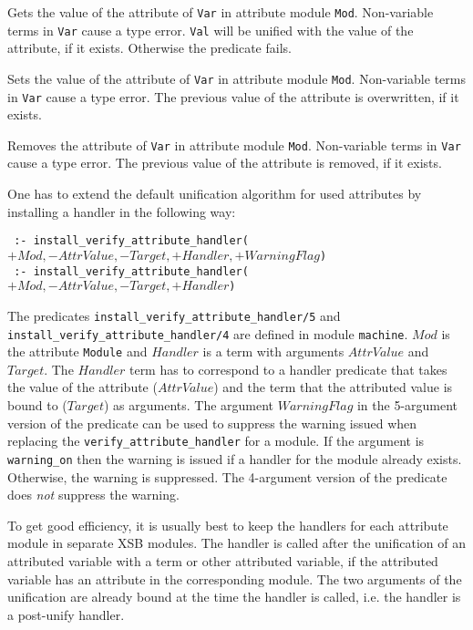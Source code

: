 \begin{description}
%
Gets the value of the attribute of \texttt{Var} in attribute module
\texttt{Mod}. Non-variable terms in \texttt{Var} cause a type
error. \texttt{Val} will be unified with the value of the attribute,
if it exists. Otherwise the predicate fails.

%
Sets the value of the attribute of \texttt{Var} in attribute module
\texttt{Mod}. Non-variable terms in \texttt{Var} cause a type
error. The previous value of the attribute is overwritten, if it
exists.

%
Removes the attribute of \texttt{Var} in attribute module
\texttt{Mod}. Non-variable terms in \texttt{Var} cause a type
error. The previous value of the attribute is removed, if it exists.
\end{description}

One has to extend the default unification algorithm for used
attributes by installing a handler in the following way:

\noindent
{\tt
:- install\_verify\_attribute\_handler($+Mod, -AttrValue, -Target, +Handler, +WarningFlag$)}
\\
{\tt
  :- install\_verify\_attribute\_handler($+Mod, -AttrValue, -Target, +Handler$)}

\noindent The
predicates
\texttt{install\_verify\_attribute\_handler/5}
and
\texttt{install\_verify\_attribute\_handler/4}
are defined in module \texttt{machine}. $Mod$ is the
attribute {\tt Module} and $Handler$ is a term with arguments
$AttrValue$ and $Target$. The $Handler$ term has to correspond to a
handler predicate that takes the value of the attribute ($AttrValue$)
and the term that the attributed value is bound to ($Target$) as
arguments. The argument $WarningFlag$ in the 5-argument version of the
predicate can be used to suppress the warning issued when replacing the
{\tt verify\_attribute\_handler} for a module. If the argument is
{\tt warning\_on} then the warning is issued if a handler for the module
already exists. Otherwise, the warning is suppressed. 
The 4-argument version of the predicate does \emph{not} suppress the
warning. 

To get good efficiency, it is usually best to keep the
handlers for each attribute module in separate XSB modules.
The handler is called after the unification of an attributed variable
with a term or other attributed variable, if the attributed variable
has an attribute in the corresponding module. The two arguments of the
unification are already bound at the time the handler is called,
i.e. the handler is a post-unify handler.

